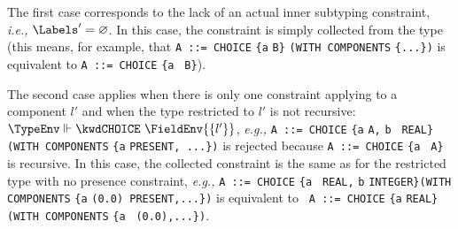 The first case corresponds to the lack of an actual inner subtyping
constraint, \emph{i.e.,} $\Labels' = \varnothing$. In this case, the
constraint is simply collected from the type \T{} (this means, for
example, that \texttt{\small A ::= CHOICE} \verb+{+\texttt{a}
\texttt{\small B}\verb+}+ \texttt{\small (WITH COMPONENTS}
\verb+{+\texttt{\small ...}\verb+}+\texttt{\small )} is equivalent to
\texttt{\small A ::= CHOICE} \verb+{+\texttt{a} \texttt{\small
B}\verb+}+).

The second case applies when there is only one \kwdPRESENT{}
constraint applying to a component $l'$ and when the \kwdCHOICE{}
type restricted to $l'$ is not recursive: $\TypeEnv
\Vdash \kwdCHOICE \,\, \FieldEnv{\{l'\}}$, \emph{e.g.,} \texttt{\small A ::=
CHOICE} \verb+{+\texttt{a} \texttt{\small A,} \texttt{b} \texttt{\small
REAL}\verb+}+ \texttt{\small (WITH COMPONENTS} \verb+{+\texttt{a}
\texttt{\small PRESENT, ...}\verb+}+\texttt{\small )} is rejected
because \texttt{\small A ::= CHOICE} \verb+{+\texttt{a} \texttt{\small
A}\verb+}+ is recursive. In this case, the collected constraint is the
same as for the restricted type with no presence constraint,
\emph{e.g.,} \texttt{\small A ::= CHOICE} \verb+{+\texttt{a} \texttt{\small
REAL,}  \texttt{b} \texttt{\small INTEGER}\verb+}+\texttt{\small (WITH
COMPONENTS} \verb+{+\texttt{a} \texttt{\small (0.0)
PRESENT,...}\verb+}+\texttt{\small )} is equivalent to \texttt{\small
A ::= CHOI\-CE} \verb+{+\texttt{a} \texttt{\small REAL}\verb+}+
\texttt{\small (WITH COMPO\-NENTS} \verb+{+\texttt{a} \texttt{\small
(0.0),...}\verb+}+\texttt{\small )}. 

\medskip

